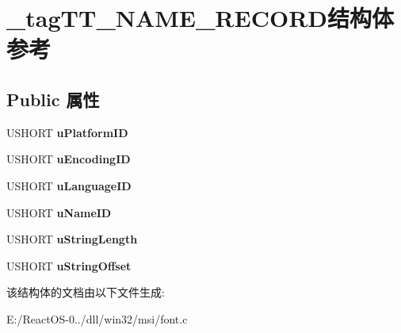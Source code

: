 \hypertarget{struct__tag_t_t___n_a_m_e___r_e_c_o_r_d}{}\section{\+\_\+tag\+T\+T\+\_\+\+N\+A\+M\+E\+\_\+\+R\+E\+C\+O\+R\+D结构体 参考}
\label{struct__tag_t_t___n_a_m_e___r_e_c_o_r_d}
\subsection*{Public 属性}
\begin{DoxyCompactItemize}
\item 
\mbox{\label{struct__tag_t_t___n_a_m_e___r_e_c_o_r_d_ac339ce9ca1f49e0cc647841f96f62f51}} 
U\+S\+H\+O\+RT {\bfseries u\+Platform\+ID}
\item 
\mbox{\label{struct__tag_t_t___n_a_m_e___r_e_c_o_r_d_a35b2a2b09a6f6e652c840aea11a03b48}} 
U\+S\+H\+O\+RT {\bfseries u\+Encoding\+ID}
\item 
\mbox{\label{struct__tag_t_t___n_a_m_e___r_e_c_o_r_d_a4b20e7e98384f2e94fca13c3ddb31e48}} 
U\+S\+H\+O\+RT {\bfseries u\+Language\+ID}
\item 
\mbox{\label{struct__tag_t_t___n_a_m_e___r_e_c_o_r_d_a9eba81280dca25952bf43effb7782586}} 
U\+S\+H\+O\+RT {\bfseries u\+Name\+ID}
\item 
\mbox{\label{struct__tag_t_t___n_a_m_e___r_e_c_o_r_d_a356e886aa1a7f5bdd3a5d1302f6cf8ba}} 
U\+S\+H\+O\+RT {\bfseries u\+String\+Length}
\item 
\mbox{\label{struct__tag_t_t___n_a_m_e___r_e_c_o_r_d_a96def6273aadf25d87800517516e11ce}} 
U\+S\+H\+O\+RT {\bfseries u\+String\+Offset}
\end{DoxyCompactItemize}


该结构体的文档由以下文件生成\+:\begin{DoxyCompactItemize}
\item 
E\+:/\+React\+O\+S-\/0../dll/win32/msi/font.\+c\end{DoxyCompactItemize}

